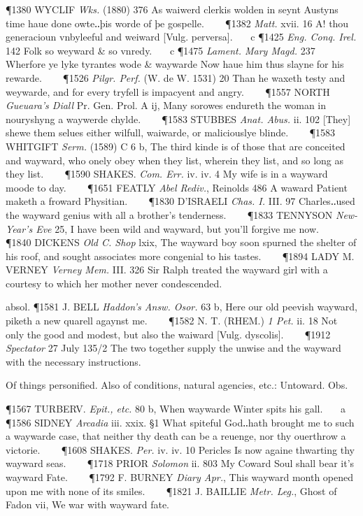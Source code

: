 \begin{description}[wide, labelwidth=!, labelindent=0pt]
\begin{myenumerate}
\P 1380 WYCLIF  \textit{Wks.} (1880) 376 As waiwerd clerkis wolden in seynt Austyns time haue done owte‥þis worde of þe gospelle.    
\P 1382 \textit{Matt.} xvii. 16 A! thou generacioun vnbyleeful and weiward [Vulg. perversa].    c 
\P 1425 \textit{Eng. Conq. Irel.} 142 Folk so weyward \& so vnredy.    c 
\P 1475 \textit{Lament.  Mary Magd.} 237 Wherfore ye lyke tyrantes wode \& waywarde Now haue him thus slayne for his rewarde.    
\P 1526  \textit{Pilgr. Perf.} (W. de W. 1531) 20 Than he waxeth testy and weywarde, and for every tryfell is impacyent and angry.    
\P 1557 NORTH  \textit{Gueuara's Diall} Pr. Gen. Prol. A ij, Many sorowes endureth the woman in nouryshyng a waywerde chylde.    
\P 1583 STUBBES  \textit{Anat. Abus.} ii. 102 [They] shewe them selues either wilfull, waiwarde, or maliciouslye blinde.    
\P 1583 WHITGIFT  \textit{Serm.} (1589) C 6 b, The third kinde is of those that are conceited and wayward, who onely obey when they list, wherein they list, and so long as they list.    
\P 1590 SHAKES.  \textit{Com. Err.} iv. iv. 4 My wife is in a wayward moode to day.    
\P 1651 FEATLY  \textit{Abel Rediv.}, Reinolds 486 A waward Patient maketh a froward Physitian.    
\P 1830 D'ISRAELI  \textit{Chas. I.} III. 97 Charles‥used the wayward genius with all a brother's tenderness.    
\P 1833 TENNYSON  \textit{New-Year's Eve} 25, I have been wild and wayward, but you'll forgive me now.    
\P 1840 DICKENS  \textit{Old C. Shop} lxix, The wayward boy soon spurned the shelter of his roof, and sought associates more congenial to his tastes.    
\P 1894 LADY  M. VERNEY \textit{Verney Mem.} III. 326 Sir Ralph treated the wayward girl with a courtesy to which her mother never condescended.

absol. \P 1581 J. BELL  \textit{Haddon's Answ. Osor.} 63 b, Here our old peevish wayward, piketh a new quarell agaynst me.    
\P 1582 N. T. (RHEM.)  \textit{1 Pet.} ii. 18 Not only the good and modest, but also the waiward [Vulg. dyscolis].    
\P 1912  \textit{Spectator} 27 July 135/2 The two together supply the unwise and the wayward with the necessary instructions.

 Of things personified. Also of conditions, natural agencies, etc.: Untoward. Obs.

\P 1567 TURBERV.  \textit{Epit., etc.} 80 b, When waywarde Winter spits his gall.    a 
\P 1586 SIDNEY  \textit{Arcadia} iii. xxix. §1 What spiteful God‥hath brought me to such a waywarde case, that neither thy death can be a reuenge, nor thy ouerthrow a victorie.    
\P 1608 SHAKES.  \textit{Per.} iv. iv. 10 Pericles Is now againe thwarting thy wayward seas.    
\P 1718 PRIOR  \textit{Solomon} ii. 803 My Coward Soul shall bear it's wayward Fate.    
\P 1792 F. BURNEY  \textit{Diary Apr.}, This wayward month opened upon me with none of its smiles.    
\P 1821 J. BAILLIE  \textit{Metr. Leg.}, Ghost of Fadon vii, We war with wayward fate.


\end{myenumerate}
\end{description}
